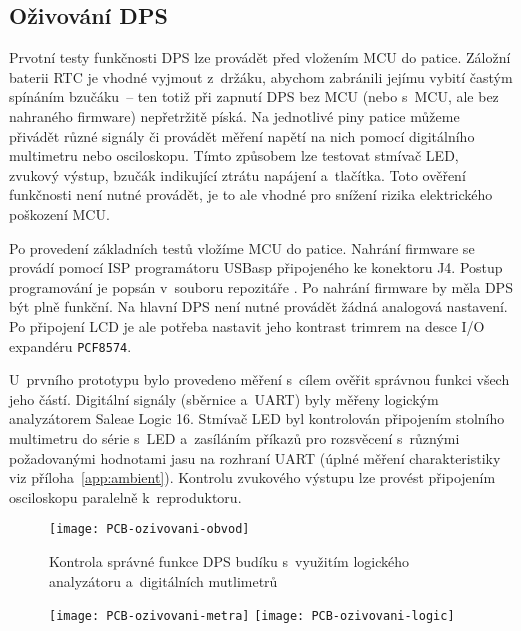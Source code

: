 \subsection{Oživování DPS}
Prvotní testy funkčnosti DPS lze provádět před vložením MCU do patice. Záložní
baterii RTC je vhodné vyjmout z~držáku, abychom zabránili jejímu vybití častým
spínáním bzučáku~-- ten totiž při zapnutí DPS bez MCU (nebo s~MCU, ale bez
nahraného firmware) nepřetržitě píská. Na jednotlivé piny patice můžeme přivádět
různé signály či provádět měření napětí na nich pomocí digitálního multimetru
nebo osciloskopu. Tímto způsobem lze testovat stmívač LED, zvukový výstup,
bzučák indikující ztrátu napájení a~tlačítka. Toto ověření funkčnosti není
nutné provádět, je to ale vhodné pro snížení rizika elektrického poškození MCU.

Po provedení základních testů vložíme MCU do patice. Nahrání firmware se
provádí pomocí ISP programátoru USBasp připojeného ke konektoru J4. Postup
programování je popsán v~souboru  repozitáře
. Po nahrání firmware by měla DPS být plně funkční.
Na hlavní DPS není nutné provádět žádná analogová nastavení. Po připojení LCD
je ale potřeba nastavit jeho kontrast trimrem na desce I/O expandéru
\texttt{PCF8574}.

U~prvního prototypu bylo provedeno měření s~cílem ověřit správnou funkci všech
jeho částí. Digitální signály (sběrnice \IIC{} a~UART) byly měřeny logickým
analyzátorem Saleae Logic 16. Stmívač LED byl kontrolován připojením stolního
multimetru do série s~LED a~zasíláním příkazů pro rozsvěcení s~různými
požadovanými hodnotami jasu na rozhraní UART (úplné měření charakteristiky viz
příloha~\vref{app:ambient}). Kontrolu zvukového výstupu lze provést připojením
osciloskopu paralelně k~reproduktoru.

\begin{figure}[htbp]
    \centering
    \texttt{[image: PCB-ozivovani-obvod]}
    \caption{%
        Kontrola správné funkce DPS budíku s~využitím logického analyzátoru
        a~digitálních mutlimetrů
    }
    \label{fig:PCB ozivovani logic}
\end{figure}
\begin{figure}\ContinuedFloat
    \centering
    \texttt{[image: PCB-ozivovani-metra]}
    \texttt{[image: PCB-ozivovani-logic]}
\end{figure}
